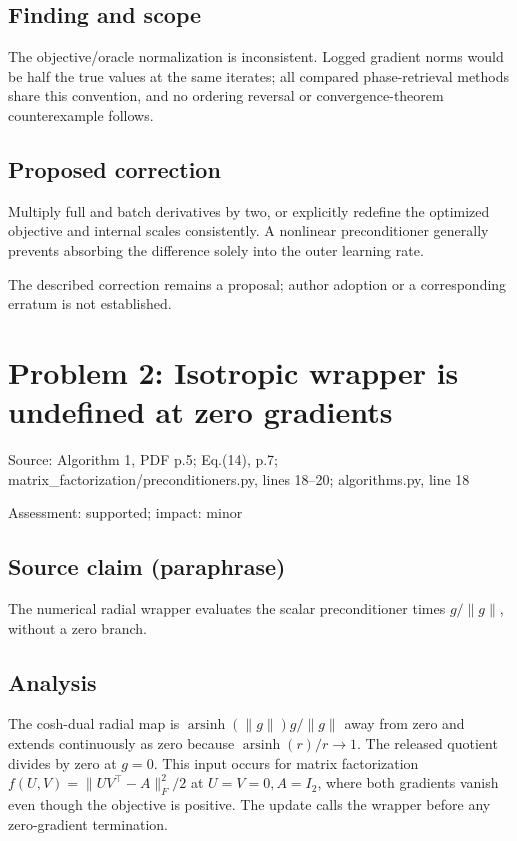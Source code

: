 \documentclass[11pt]{article}
\begin{document}
\subsection*{Finding and scope}

The objective/oracle normalization is inconsistent. Logged gradient norms would be half the true values at the same iterates; all compared phase-retrieval methods share this convention, and no ordering reversal or convergence-theorem counterexample follows.

\subsection*{Proposed correction}

Multiply full and batch derivatives by two, or explicitly redefine the optimized objective and internal scales consistently. A nonlinear preconditioner generally prevents absorbing the difference solely into the outer learning rate.

The described correction remains a proposal; author adoption or a corresponding erratum is not established.

\section*{Problem 2: Isotropic wrapper is undefined at zero gradients}

Source: Algorithm 1, PDF p.5; Eq.(14), p.7; matrix\_factorization/preconditioners.py, lines 18–20; algorithms.py, line 18

Assessment: supported; impact: minor

\subsection*{Source claim (paraphrase)}

The numerical radial wrapper evaluates the scalar preconditioner times \(g/\|g\|\), without a zero branch.

\subsection*{Analysis}

The cosh-dual radial map is \(\operatorname{arsinh}(\|g\|)g/\|g\|\) away from zero and extends continuously as zero because \(\operatorname{arsinh}(r)/r\to1\). The released quotient divides by zero at \(g=0\). This input occurs for matrix factorization \(f(U,V)=\|UV^\top-A\|_F^2/2\) at \(U=V=0,A=I_2\), where both gradients vanish even though the objective is positive. The update calls the wrapper before any zero-gradient termination.
\end{document}
